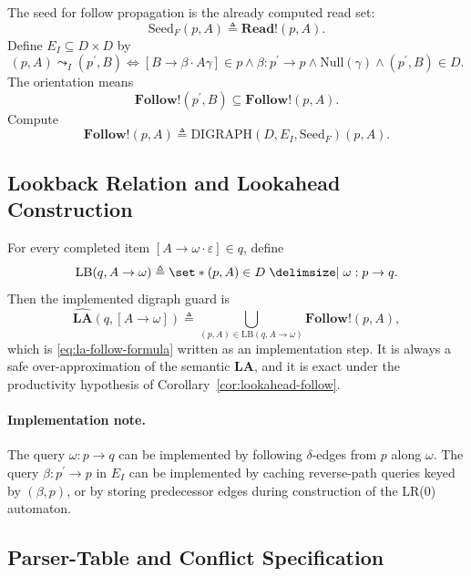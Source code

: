 \documentclass[11pt,a4paper]{article}
\theoremstyle{prettyplain}
\theoremstyle{prettydef}
\def\mid{\;\delimsize\vert\;}#1%
\newcommand{\eps}{\varepsilon}
\newcommand{\Path}[3]{#1:#2\to#3}
\newcommand{\Item}[2]{[#1\to #2]}
\newcommand{\Look}{\mathbf{LA}}
\newcommand{\Read}{\mathbf{Read}}
\newcommand{\Follow}{\mathbf{Follow}}
\begin{document}
The seed for follow propagation is the already computed read set:
\[
\mathrm{Seed}_F(p,A)\triangleq\Read\mathbin{!}(p,A).
\]
Define \(E_I\subseteq D\times D\) by
\[
(p,A)\leadsto_I(p^\prime,B)
\Longleftrightarrow
\Item{B}{\beta\cdot A\gamma}\in p
\land
\Path{\beta}{p^\prime}{p}
\land
\mathrm{Null}(\gamma)
\land
(p^\prime,B)\in D.
\]
The orientation means
\[
\Follow\mathbin{!}(p^\prime,B)\subseteq\Follow\mathbin{!}(p,A).
\]
Compute
\[
\Follow\mathbin{!}(p,A)
\triangleq
\mathrm{DIGRAPH}(D,E_I,\mathrm{Seed}_F)(p,A).
\]

\subsection{Lookback Relation and Lookahead Construction}

For every completed item \(\Item{A}{\omega\cdot\eps}\in q\), define
\[
\mathrm{LB}(q,A\to\omega)
\triangleq
\set*{(p,A)\in D\mid \Path{\omega}{p}{q}}.
\]
Then the implemented digraph guard is
\[
\widehat{\Look}(q,\Item{A}{\omega})
\triangleq
\bigcup_{(p,A)\in\mathrm{LB}(q,A\to\omega)}
\Follow\mathbin{!}(p,A),
\]
which is \eqref{eq:la-follow-formula} written as an implementation step.  It is
always a safe over-approximation of the semantic \(\Look\), and it is exact under
the productivity hypothesis of Corollary~\ref{cor:lookahead-follow}.

\paragraph{Implementation note.}
The query \(\Path{\omega}{p}{q}\) can be implemented by following
\(\delta\)-edges from \(p\) along \(\omega\).  The query
\(\Path{\beta}{p^\prime}{p}\) in \(E_I\) can be implemented by caching
reverse-path queries keyed by \((\beta,p)\), or by storing predecessor edges
during construction of the LR(0) automaton.

\subsection{Parser-Table and Conflict Specification}
\end{document}
